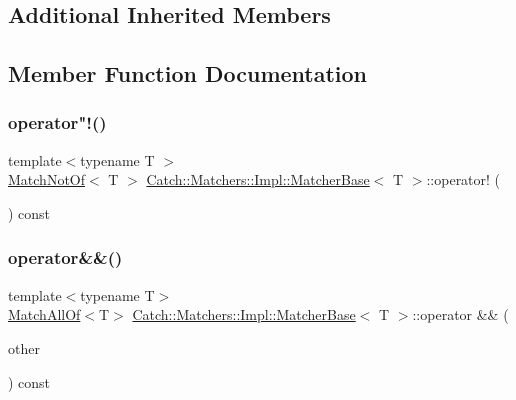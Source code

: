\subsection*{Additional Inherited Members}


\subsection{Member Function Documentation}
\mbox{\label{struct_catch_1_1_matchers_1_1_impl_1_1_matcher_base_a5bb94bf2ff5c7ef73b7c11eb173bdf3b}} 
\subsubsection{\texorpdfstring{operator"!()}{operator!()}}
{\footnotesize\ttfamily template$<$typename T $>$ \\
\mbox{\hyperlink{struct_catch_1_1_matchers_1_1_impl_1_1_match_not_of}{Match\+Not\+Of}}$<$ T $>$ \mbox{\hyperlink{struct_catch_1_1_matchers_1_1_impl_1_1_matcher_base}{Catch\+::\+Matchers\+::\+Impl\+::\+Matcher\+Base}}$<$ T $>$\+::operator! (\begin{DoxyParamCaption}{ }\end{DoxyParamCaption}) const}

\mbox{\label{struct_catch_1_1_matchers_1_1_impl_1_1_matcher_base_a23c336f6d9457735ddc8dc7ea864d7c9}} 
\subsubsection{\texorpdfstring{operator\&\&()}{operator\&\&()}}
{\footnotesize\ttfamily template$<$typename T$>$ \\
\mbox{\hyperlink{struct_catch_1_1_matchers_1_1_impl_1_1_match_all_of}{Match\+All\+Of}}$<$T$>$ \mbox{\hyperlink{struct_catch_1_1_matchers_1_1_impl_1_1_matcher_base}{Catch\+::\+Matchers\+::\+Impl\+::\+Matcher\+Base}}$<$ T $>$\+::operator \&\& (\begin{DoxyParamCaption}\item[{\mbox{\hyperlink{struct_catch_1_1_matchers_1_1_impl_1_1_matcher_base}{Matcher\+Base}}$<$ T $>$ const \&}]{other }\end{DoxyParamCaption}) const}

